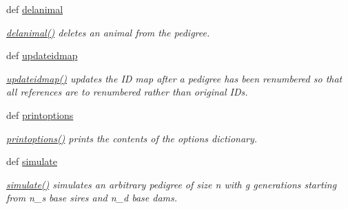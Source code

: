 \begin{DoxyCompactItemize}
def \hyperlink{classPyPedal_1_1pyp__newclasses_1_1NewPedigree_a646940eb2010d378c761e3c8c0e584e6}{delanimal}
\begin{DoxyCompactList}\small\item\em \hyperlink{classPyPedal_1_1pyp__newclasses_1_1NewPedigree_a646940eb2010d378c761e3c8c0e584e6}{delanimal()} deletes an animal from the pedigree. \end{DoxyCompactList}\item 
def \hyperlink{classPyPedal_1_1pyp__newclasses_1_1NewPedigree_a5f2e95dd43e8bf2b4bfa2907eebd62a1}{updateidmap}
\begin{DoxyCompactList}\small\item\em \hyperlink{classPyPedal_1_1pyp__newclasses_1_1NewPedigree_a5f2e95dd43e8bf2b4bfa2907eebd62a1}{updateidmap()} updates the ID map after a pedigree has been renumbered so that all references are to renumbered rather than original IDs. \end{DoxyCompactList}\item 
def \hyperlink{classPyPedal_1_1pyp__newclasses_1_1NewPedigree_ade3f012ba187d2a311e8e85b82167a3f}{printoptions}
\begin{DoxyCompactList}\small\item\em \hyperlink{classPyPedal_1_1pyp__newclasses_1_1NewPedigree_ade3f012ba187d2a311e8e85b82167a3f}{printoptions()} prints the contents of the options dictionary. \end{DoxyCompactList}\item 
def \hyperlink{classPyPedal_1_1pyp__newclasses_1_1NewPedigree_a1d239866c3dacb51ad925bbdf9337001}{simulate}
\begin{DoxyCompactList}\small\item\em \hyperlink{classPyPedal_1_1pyp__newclasses_1_1NewPedigree_a1d239866c3dacb51ad925bbdf9337001}{simulate()} simulates an arbitrary pedigree of size n with g generations starting from n\_\-s base sires and n\_\-d base dams. \end{DoxyCompactList}\end{DoxyCompactItemize}
